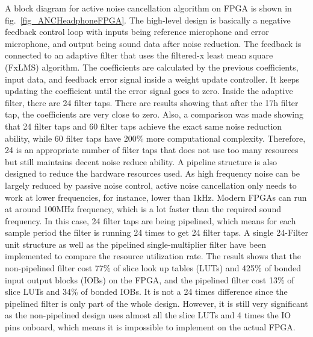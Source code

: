 A block diagram for active noise cancellation algorithm on FPGA \cite{ANC_Headphone_3} is shown in fig.~\ref{fig_ANCHeadphoneFPGA}.  The high-level design is basically a negative feedback control loop with inputs being reference microphone and error microphone, and output being sound data after noise reduction.  The feedback is connected to an adaptive filter that uses the filtered-x least mean square (FxLMS) algorithm.  The coefficients are calculated by the previous coefficients, input data, and feedback error signal inside a weight update controller.  It keeps updating the coefficient until the error signal goes to zero.  Inside the adaptive filter, there are 24 filter taps.  There are results showing that after the 17h filter tap, the coefficients are very close to zero.  Also, a comparison was made showing that 24 filter taps and 60 filter taps achieve the exact same noise reduction ability, while 60 filter taps have 200\% more computational complexity.  Therefore, 24 is an appropriate number of filter taps that does not use too many resources but still maintains decent noise reduce ability.  A pipeline structure is also designed to reduce the hardware resources used.  As high frequency noise can be largely reduced by passive noise control, active noise cancellation only needs to work at lower frequencies, for instance, lower than 1kHz.  Modern FPGAs can run at around 100MHz frequency, which is a lot faster than the required sound frequency.  In this case, 24 filter taps are being pipelined, which means for each sample period the filter is running 24 times to get 24 filter taps.  A single 24-Filter unit structure as well as the pipelined single-multiplier filter have been implemented to compare the resource utilization rate.  The result shows that the non-pipelined filter cost 77\% of slice look up tables (LUTs) and 425\% of bonded input output blocks (IOBs) on the FPGA, and the pipelined filter cost 13\% of slice LUTs and 34\% of bonded IOBs.  It is not a 24 times difference since the pipelined filter is only part of the whole design.  However, it is still very significant as the non-pipelined design uses almost all the slice LUTs and 4 times the IO pins onboard, which means it is impossible to implement on the actual FPGA.


